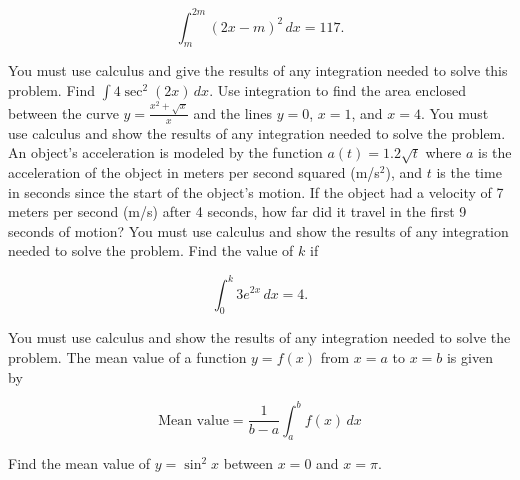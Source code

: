 \documentclass[12pt,addpoints]{exam}
\begin{document}
\begin{questions}
\[
\int_{m}^{2m} (2x - m)^2 \, dx = 117.
\]

You must use calculus and give the results of any integration needed to solve this problem.
\fillwithlines{5cm}
\question[5] Find \(\int 4 \sec^2(2x) \, dx\).
\fillwithlines{5cm}
\question[5] Use integration to find the area enclosed between the curve \( y = \frac{x^2 + \sqrt{x}}{x} \) and the lines \( y = 0 \), \( x = 1 \), and \( x = 4 \). You must use calculus and show the results of any integration needed to solve the problem.
\fillwithlines{5cm}
\question[5] An object's acceleration is modeled by the function \( a(t) = 1.2\sqrt{t} \) where \( a \) is the acceleration of the object in meters per second squared (m/s\(^2\)), and \( t \) is the time in seconds since the start of the object's motion. If the object had a velocity of 7 meters per second (m/s) after 4 seconds, how far did it travel in the first 9 seconds of motion? You must use calculus and show the results of any integration needed to solve the problem.
\fillwithlines{5cm}
\question[5] Find the value of \( k \) if

\[ \int_{0}^{k} 3e^{2x} \, dx = 4. \]

You must use calculus and show the results of any integration needed to solve the problem.
\fillwithlines{5cm}
\question[5] The mean value of a function \( y = f(x) \) from \( x = a \) to \( x = b \) is given by

\[
\text{Mean value} = \frac{1}{b-a} \int_{a}^{b} f(x) \, dx
\]

Find the mean value of \( y = \sin^2 x \) between \( x = 0 \) and \( x = \pi \).


\end{questions}
\end{document}
